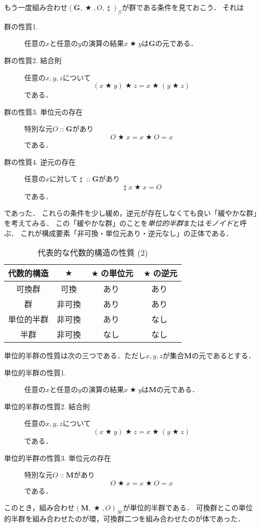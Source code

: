 \documentclass[twocolumn]{jsbook}
\DeclareMathOperator{\mathAnyBinaryOperator}{\bigstar}
\DeclareMathOperator{\mathInverse}{\sharp}
\DeclareMathOperator{\mathIn}{::}
\newcommand{\mathSet}[1]{\mathbf{#1}}
\newcommand{\mathMonoid}[3]{(#1,#2,#3)_\mathcal{M}}
\newcommand{\mathGroup}[4]{(#1,#2,#3,#4)_\mathcal{G}}
\newcommand{\keyword}[1]{\emph{#1}}
\begin{document}
もう一度組み合わせ$\mathGroup{\mathSet{G}}{\mathAnyBinaryOperator}{O}{\mathInverse}$が群である条件を見ておこう．
それは
\begin{description}
\item[群の性質1.] 任意の$x$と任意の$y$の演算の結果$x\mathAnyBinaryOperator y$は$\mathSet{G}$の元である．
\item[群の性質2. 結合則] 任意の$x,y,z$について$$(x\mathAnyBinaryOperator y)\mathAnyBinaryOperator z=x\mathAnyBinaryOperator(y\mathAnyBinaryOperator z)$$である．
\item[群の性質3. 単位元の存在] 特別な元$O\mathIn\mathSet{G}$があり$$O\mathAnyBinaryOperator x=x\mathAnyBinaryOperator O=x$$である．
\item[群の性質4. 逆元の存在] 任意の$x$に対して$\mathInverse\mathIn\mathSet{G}$があり$$\mathInverse x\mathAnyBinaryOperator x=O$$である．
\end{description}
であった．
これらの条件を少し緩め，逆元が存在しなくても良い「緩やかな群」を考えてみる．
この「緩やかな群」のことを\keyword{単位的半群}または\keyword{モノイド}と呼ぶ．
これが構成要素「非可換・単位元あり・逆元なし」の正体である．

\begin{table}
\caption{代表的な代数的構造の性質 (2)}
\label{tab:group-and-monoid}
\begin{center}
\begin{tabular}{||c||c|c|c||}
\hline
代数的構造&$\mathAnyBinaryOperator$&$\mathAnyBinaryOperator$の単位元&$\mathAnyBinaryOperator$の逆元\\
\hline\hline
可換群&可換&あり&あり\\
群&非可換&あり&あり\\
単位的半群&非可換&あり&なし\\
半群&非可換&なし&なし\\
\hline
\end{tabular}
\end{center}
\end{table}

単位的半群の性質は次の三つである．ただし$x,y,z$が集合$\mathSet{M}$の元であるとする．
\begin{description}
\item[単位的半群の性質1.] 任意の$x$と任意の$y$の演算の結果$x\mathAnyBinaryOperator y$は$\mathSet{M}$の元である．
\item[単位的半群の性質2. 結合則] 任意の$x,y,z$について$$(x\mathAnyBinaryOperator y)\mathAnyBinaryOperator z=x\mathAnyBinaryOperator(y\mathAnyBinaryOperator z)$$である．
\item[単位的半群の性質3. 単位元の存在] 特別な元$O\mathIn\mathSet{M}$があり$$O\mathAnyBinaryOperator x=x\mathAnyBinaryOperator O=x$$である．
\end{description}
このとき，組み合わせ$\mathMonoid{\mathSet{M}}{\mathAnyBinaryOperator}{O}$が単位的半群である．
可換群とこの単位的半群を組み合わせたのが環，可換群二つを組み合わせたのが体であった．
\end{document}
